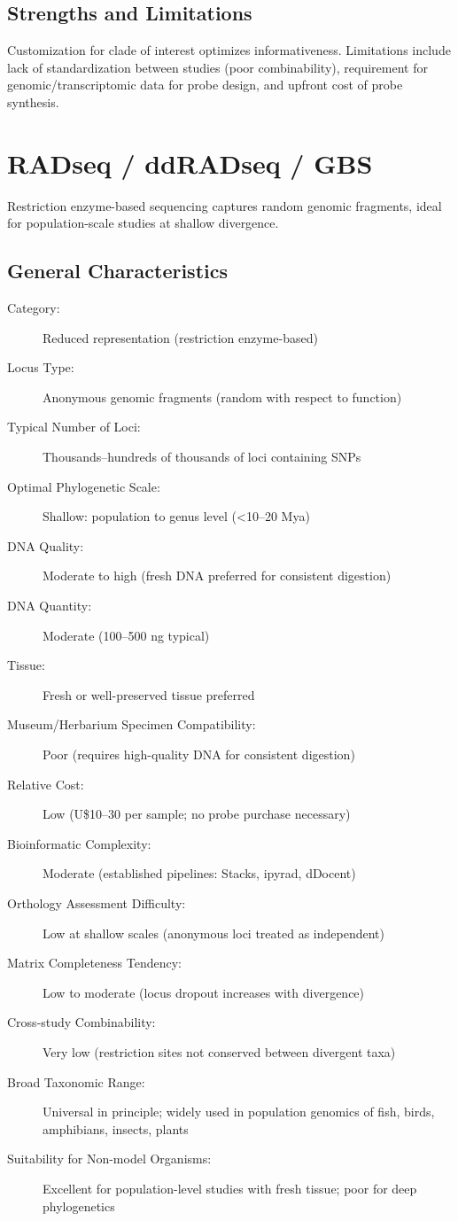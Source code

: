 \subsection{Strengths and Limitations}

Customization for clade of interest optimizes informativeness. Limitations include lack of standardization between studies (poor combinability), requirement for genomic/transcriptomic data for probe design, and upfront cost of probe synthesis.

\textcite{bi2012, bragg2016, portik2016}

\section{RADseq / ddRADseq / GBS}

Restriction enzyme-based sequencing captures random genomic fragments, ideal for population-scale studies at shallow divergence.

\subsection{General Characteristics}

\begin{description}
\item[Category:] Reduced representation (restriction enzyme-based)
\item[Locus Type:] Anonymous genomic fragments (random with respect to function)
\item[Typical Number of Loci:] Thousands--hundreds of thousands of loci containing SNPs
\item[Optimal Phylogenetic Scale:] Shallow: population to genus level (<10--20 Mya)
\item[DNA Quality:] Moderate to high (fresh DNA preferred for consistent digestion)
\item[DNA Quantity:] Moderate (100--500 ng typical)
\item[Tissue:] Fresh or well-preserved tissue preferred
\item[Museum/Herbarium Specimen Compatibility:] Poor (requires high-quality DNA for consistent digestion)
\item[Relative Cost:] Low (U\$10--30 per sample; no probe purchase necessary)
\item[Bioinformatic Complexity:] Moderate (established pipelines: Stacks, ipyrad, dDocent)
\item[Orthology Assessment Difficulty:] Low at shallow scales (anonymous loci treated as independent)
\item[Matrix Completeness Tendency:] Low to moderate (locus dropout increases with divergence)
\item[Cross-study Combinability:] Very low (restriction sites not conserved between divergent taxa)
\item[Broad Taxonomic Range:] Universal in principle; widely used in population genomics of fish, birds, amphibians, insects, plants
\item[Suitability for Non-model Organisms:] Excellent for population-level studies with fresh tissue; poor for deep phylogenetics
\end{description}

